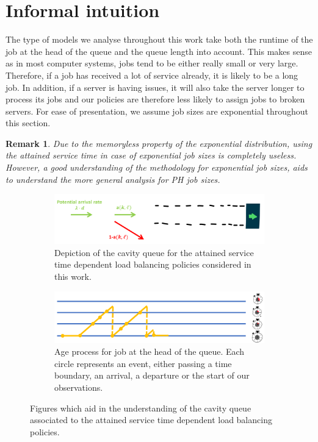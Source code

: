 \documentclass[12pt]{report}
\newtheorem{remark}{Remark}
\begin{document}
\section{Informal intuition} \label{sec:intuition_improved}
The type of models we analyse throughout this work take both the runtime of the job at the head of the queue and the queue length into account. This makes sense as in most computer systems, jobs tend to be either really small or very large. Therefore, if a job has received a lot of service already, it is likely to be a long job. In addition, if a server is having issues, it will also take the server longer to process its jobs and our policies are therefore less likely to assign jobs to broken servers. For ease of presentation, we assume job sizes are exponential throughout this section.
\begin{remark}
	Due to the memoryless property of the exponential distribution, using the attained service time in case of exponential job sizes is completely useless. However, a good understanding of the methodology for exponential job sizes, aids to understand the more general analysis for PH job sizes.
\end{remark}

\begin{figure}[t]
	\begin{subfigure}{0.8\textwidth}
		\centering
		\captionsetup{width=.8\linewidth}
		\includegraphics[width=1\linewidth]{figures/Chapter7/queue_cavity.PNG}
		\caption{Depiction of the cavity queue for the attained service time dependent load balancing policies considered in this work.}
		\label{fig:cavity_improved}
	\end{subfigure}
	\begin{subfigure}{.8\textwidth}
		\centering
		\captionsetup{width=.8\linewidth}
		\includegraphics[width=1\linewidth]{figures/Chapter7/age_process.PNG}
		\caption{Age process for job at the head of the queue. Each circle represents an event, either passing a time boundary, an arrival, a departure or the start of our observations.}
		\label{fig:age_improved}
	\end{subfigure}
	\caption{Figures which aid in the understanding of the cavity queue associated to the attained service time dependent load balancing policies.}
	\label{fig:cavity_age_improved}
\end{figure}
\end{document}
